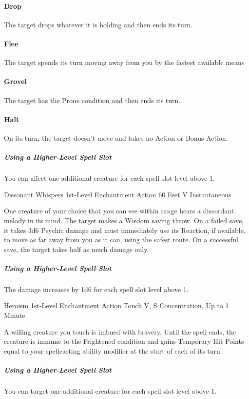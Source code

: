 \documentclass[letterpaper,openany,oneside,twocolumn]{book}
\begin{document}
\paragraph*{Drop} The target drops whatever it is holding and then ends its turn.

\paragraph*{Flee} The target spends its turn moving away from you by the fastest available means

\paragraph*{Grovel} The target has the Prone condition and then ends its turn.

\paragraph*{Halt} On its turn, the target doesn't move and takes no Action or Bonus Action.

\subparagraph*{Using a Higher-Level Spell Slot} You can affect one additional creature for each spell slot level above 1.

\DndSpellHeader
  {Dissonant Whispers}
  {1st-Level Enchantment}
  {Action}
  {60 Feet}
  {V}
  {Instantaneous}

One creature of your choice that you can see within range hears a discordant melody in its mind. The target makes a Wisdom saving throw. On a failed save, it takes 3d6 Psychic damage and must immediately use its Reaction, if available, to move as far away from you as it can, using the safest route. On a successful save, the target takes half as much damage only.

\subparagraph*{Using a Higher-Level Spell Slot} The damage increases by 1d6 for each spell slot level above 1.

\DndSpellHeader
  {Heroism}
  {1st-Level Enchantment}
  {Action}
  {Touch}
  {V, S}
  {Concentration, Up to 1 Minute}

A willing creature you touch is imbued with bravery. Until the spell ends, the creature is immune to the Frightened condition and gains Temporary Hit Points equal to your spellcasting ability modifier at the start of each of its turn.

\subparagraph*{Using a Higher-Level Spell Slot} You can target one additional creature for each spell slot level above 1.
\end{document}
